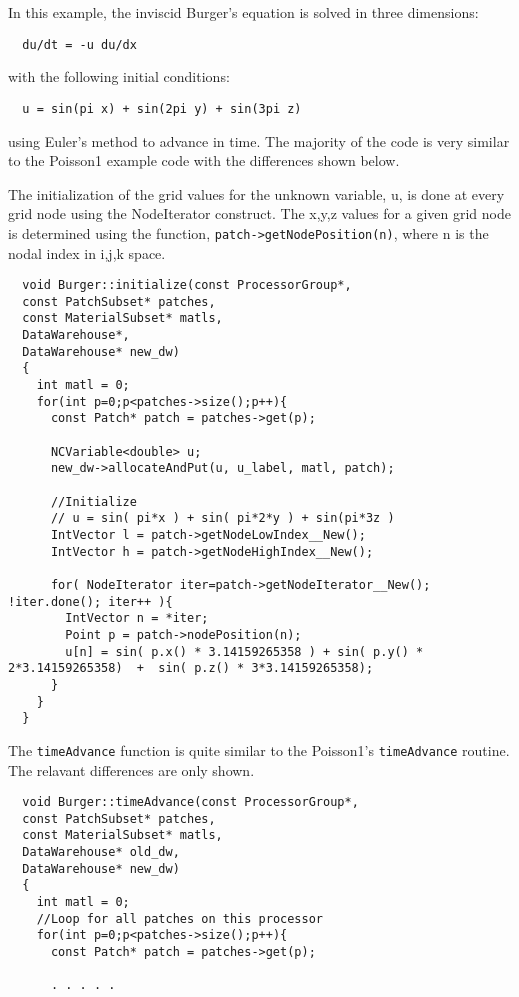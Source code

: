 \documentclass[11pt,fleqn]{book} %
\begin{document}
In this example, the inviscid Burger's equation is solved in three dimensions:
\begin{lstlisting}
  du/dt = -u du/dx  
\end{lstlisting}

with the following initial conditions:

\begin{lstlisting}
  u = sin(pi x) + sin(2pi y) + sin(3pi z)
\end{lstlisting}

using Euler's method to advance in time.  The majority of the code is
very similar to the Poisson1 example code with the differences shown
below.

The initialization of the grid values for the unknown variable, u, is
done at every grid node using the NodeIterator construct.  The x,y,z
values for a given grid node is determined using the function,
\texttt{patch->getNodePosition(n)}, where n is the nodal index in
i,j,k space.

\begin{lstlisting}
  void Burger::initialize(const ProcessorGroup*,
  const PatchSubset* patches,
  const MaterialSubset* matls,
  DataWarehouse*, 
  DataWarehouse* new_dw)
  {
    int matl = 0;
    for(int p=0;p<patches->size();p++){
      const Patch* patch = patches->get(p);

      NCVariable<double> u;
      new_dw->allocateAndPut(u, u_label, matl, patch);

      //Initialize
      // u = sin( pi*x ) + sin( pi*2*y ) + sin(pi*3z )
      IntVector l = patch->getNodeLowIndex__New();
      IntVector h = patch->getNodeHighIndex__New();
      
      for( NodeIterator iter=patch->getNodeIterator__New(); !iter.done(); iter++ ){
        IntVector n = *iter;
        Point p = patch->nodePosition(n);
        u[n] = sin( p.x() * 3.14159265358 ) + sin( p.y() * 2*3.14159265358)  +  sin( p.z() * 3*3.14159265358);
      }
    }
  }

\end{lstlisting}

The \texttt{timeAdvance} function is quite similar to the Poisson1's
\texttt{timeAdvance} routine.  The relavant differences are only
shown.

\begin{lstlisting}
  void Burger::timeAdvance(const ProcessorGroup*,
  const PatchSubset* patches,
  const MaterialSubset* matls,
  DataWarehouse* old_dw, 
  DataWarehouse* new_dw)
  {
    int matl = 0;
    //Loop for all patches on this processor
    for(int p=0;p<patches->size();p++){
      const Patch* patch = patches->get(p);
      
      . . . . .
    \end{lstlisting}
\end{document}
